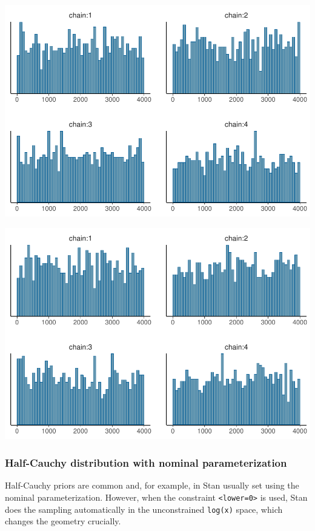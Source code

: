 \documentclass[american,]{article}
\begin{document}
\includegraphics{graphics/hist-fit-alt3-1.pdf}

\includegraphics{graphics/hist-fit-alt3-lp-1.pdf}

\hypertarget{half-cauchy-distribution-with-nominal-parameterization}{%
\subsubsection*{Half-Cauchy distribution with nominal
parameterization}\label{half-cauchy-distribution-with-nominal-parameterization}}

Half-Cauchy priors are common and, for example, in Stan usually set
using the nominal parameterization. However, when the constraint
\texttt{\textless{}lower=0\textgreater{}} is used, Stan does the
sampling automatically in the unconstrained \texttt{log(x)} space, which
changes the geometry crucially.
\end{document}
